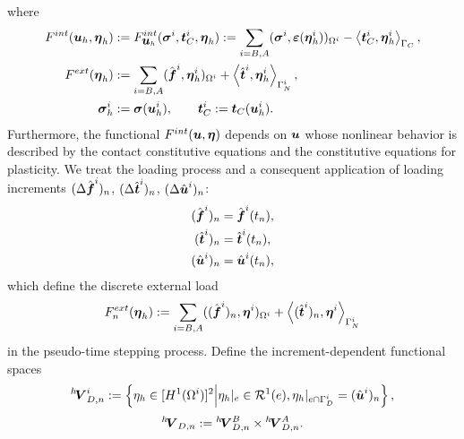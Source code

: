 \documentclass[12pt,a4paper]{scrbook}
\begin{document}
where
\begin{align*}
F^{int}(\mbox{\boldmath$u$}_{h},\mbox{\boldmath$\eta$}_h) &:= F^{int}_{\mbox{\boldmath$u$}_{h}}(\mbox{\boldmath$\sigma$}^i,\mbox{\boldmath$t$}_C^i,\mbox{\boldmath$\eta$}_h) := \sum_{i=B,A} ( \mbox{\boldmath$\sigma$}^i, \mbox{\boldmath$\varepsilon$}(\mbox{\boldmath$\eta$}^i_h))_{\Omega^i}
- \left\langle \mbox{\boldmath$t$}_C^i, \mbox{\boldmath$\eta$}^i_h\right\rangle_{\Gamma_C}, \\
F^{ext}(\mbox{\boldmath$\eta$}_h) &:= \sum_{i=B,A} (\hat{\mbox{\boldmath$f$}}^i, \mbox{\boldmath$\eta$}^i_h)_{\Omega^i}
+ \left\langle \hat{\mbox{\boldmath$t$}}^i, \mbox{\boldmath$\eta$}^i_h \right\rangle_{\Gamma^i_N}, \\
\mbox{\boldmath$\sigma$}^i_h &:= \mbox{\boldmath$\sigma$}(\mbox{\boldmath$u$}^i_h), \qquad \mbox{\boldmath$t$}_C^i := \mbox{\boldmath$t$}_C(\mbox{\boldmath$u$}^i_h).
\end{align*}
Furthermore, the functional $F^{int}(\mbox{\boldmath$u$},\mbox{\boldmath$\eta$})$ depends on $\mbox{\boldmath$u$}$ whose nonlinear behavior is described by the contact constitutive equations and the constitutive equations for plasticity. We treat the loading process and a consequent application of loading increments $(\Delta \hat{\mbox{\boldmath$f$}}^i)_n$, $(\Delta \hat{\mbox{\boldmath$t$}}^i)_n$, $(\Delta \hat{\mbox{\boldmath$u$}}^i)_n$:
\begin{align*}
(\hat{\mbox{\boldmath$f$}}^i)_{n} &= \hat{\mbox{\boldmath$f$}}^i(t_{n}), \\
(\hat{\mbox{\boldmath$t$}}^i)_{n} &= \hat{\mbox{\boldmath$t$}}^i(t_{n}), \\
(\hat{\mbox{\boldmath$u$}}^i)_{n} &= \hat{\mbox{\boldmath$u$}}^i(t_{n}),
\end{align*}
which define the discrete external load
\begin{equation}\nonumber
F^{ext}_{n}(\mbox{\boldmath$\eta$}_h) := \sum_{i=B,A} ((\hat{\mbox{\boldmath$f$}}^i)_{n}, \mbox{\boldmath$\eta$}^i)_{\Omega^i}
+ \left\langle (\hat{\mbox{\boldmath$t$}}^i)_{n}, \mbox{\boldmath$\eta$}^i \right\rangle_{\Gamma^i_N}
\end{equation}
in the pseudo-time stepping process. Define the increment-dependent functional spaces
\begin{equation}\nonumber
{}^h\!\mbox{\boldmath$V$}^i_{D,n} := \left\lbrace \eta_h \in [H^1(\Omega^i)]^2 \middle| \eta_h|_e \in {\cal R}^1(e), \eta_h|_{e \cap \Gamma_D^i} =  (\hat{\mbox{\boldmath$u$}}^i)_{n} \right\rbrace,
\end{equation}
\begin{equation}\nonumber
{}^h\!\mbox{\boldmath$V$}_{D,n} := {}^h\!\mbox{\boldmath$V$}^{B}_{D,n} \times {}^h\!\mbox{\boldmath$V$}^{A}_{D,n}.
\end{equation}
\end{document}
